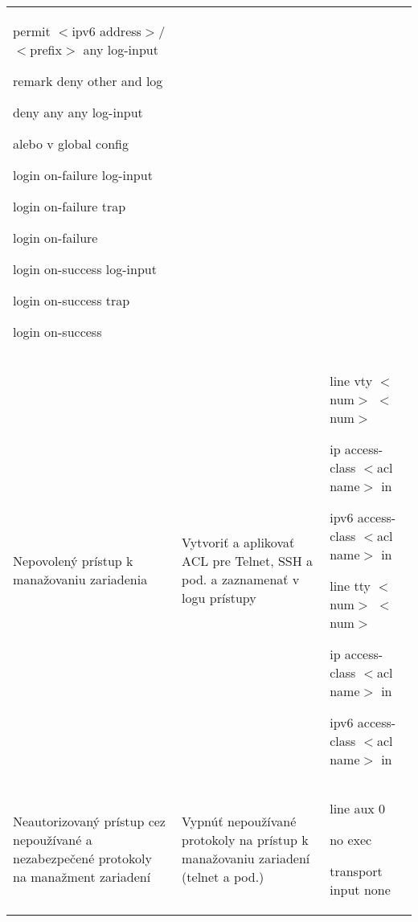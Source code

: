 \begin{longtable}[!htbp]{|L{10em}L{10em}>{\selectfont}L{34em}|}
	\hspace{0.5em}permit $<$ipv6 address$>$/$<$prefix$>$ any log-input
	
	\hspace{0.5em}remark deny other and log
	
	\hspace{0.5em}deny any any log-input
	
	\vspace{0.5em}
	{\selectfont alebo v global config }
	\vspace{0.5em}
	
	login on-failure log-input
	
	login on-failure trap
	
	login on-failure
	
	login on-success log-input
	
	login on-success trap
	
	login on-success\\
	
	
	
	
	Nepovolený prístup k manažovaniu zariadenia	&Vytvoriť a aplikovať ACL pre Telnet, SSH a pod. a zaznamenať v logu prístupy	&line vty $<$num$>$ $<$num$>$
	
	\hspace{0.5em}ip access-class $<$acl name$>$ in
	
	\hspace{0.5em}ipv6 access-class $<$acl name$>$ in
	
	\vspace{0.5em}line tty $<$num$>$ $<$num$>$
	
	\hspace{0.5em}ip access-class $<$acl name$>$ in
	
	\hspace{0.5em}ipv6 access-class $<$acl name$>$ in\\
	
	
	
	
	
	Neautorizovaný prístup cez nepoužívané a nezabezpečené protokoly na manažment zariadení	&Vypnúť nepoužívané protokoly na prístup k manažovaniu zariadení (telnet a pod.)	&line aux 0
	
	\hspace{0.5em}no exec
	
	\hspace{0.5em}transport input none\\
	
	
	

\end{longtable}
